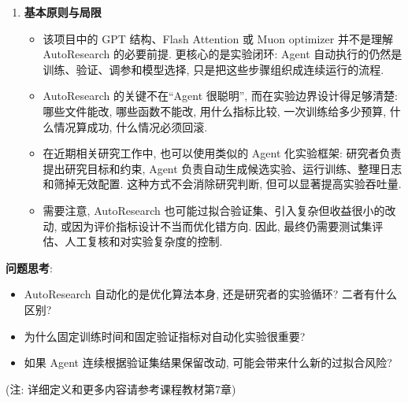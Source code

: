 \documentclass{../nndlcourse}
\begin{document}
\begin{enumerate}
\begin{itemize}
\begin{itemize}
          \item \texttt{train.py}: Agent 唯一允许修改的核心文件. 它包含模型、optimizer、batch size、学习率、训练循环和最终打印的实验摘要.
          \item \texttt{program.md}: 人类写给 Agent 的实验规则. 它规定先跑 baseline, 再循环执行“修改 \texttt{train.py}、提交、训练、读取指标、记录结果、保留或回滚”.
        \end{itemize}
      \item 固定 5 分钟训练预算是一个关键设计. 如果某次改动让模型更大, 它可能单步更强但训练步数更少; 如果某次改动让模型更小, 它可能单步更弱但跑得更快. 固定真实耗时后, 比较的是“在同一算力和时间约束下谁能在没见过的数据上预测得更好”.
      \item \texttt{program.md} 还要求把每次实验写入 \texttt{results.tsv}, 包括这次代码版本记录 (commit)、验证集预测损失、显存、状态和实验描述. 若指标改善, 就保留这次代码版本; 若指标变差或程序崩溃, 就回到上一版. 这相当于把研究过程做成一个可复现的闭环:
      \[
        \text{提出想法}
        \rightarrow
        \text{改代码}
        \rightarrow
        \text{固定预算训练}
        \rightarrow
        \text{验证集评价}
        \rightarrow
        \text{记录并保留/回滚}.
      \]
    \end{itemize}
  \item \textbf{基本原则与局限}
    \begin{itemize}
      \item 该项目中的 GPT 结构、Flash Attention 或 Muon optimizer 并不是理解 AutoResearch 的必要前提. 更核心的是实验闭环: Agent 自动执行的仍然是训练、验证、调参和模型选择, 只是把这些步骤组织成连续运行的流程.
      \item AutoResearch 的关键不在“Agent 很聪明”, 而在实验边界设计得足够清楚: 哪些文件能改, 哪些函数不能改, 用什么指标比较, 一次训练给多少预算, 什么情况算成功, 什么情况必须回滚.
      \item 在近期相关研究工作中, 也可以使用类似的 Agent 化实验框架: 研究者负责提出研究目标和约束, Agent 负责自动生成候选实验、运行训练、整理日志和筛掉无效配置. 这种方式不会消除研究判断, 但可以显著提高实验吞吐量.
      \item 需要注意, AutoResearch 也可能过拟合验证集、引入复杂但收益很小的改动, 或因为评价指标设计不当而优化错方向. 因此, 最终仍需要测试集评估、人工复核和对实验复杂度的控制.
    \end{itemize}
\end{enumerate}

\textbf{问题思考}:
\begin{itemize}
  \item AutoResearch 自动化的是优化算法本身, 还是研究者的实验循环? 二者有什么区别?
  \item 为什么固定训练时间和固定验证指标对自动化实验很重要?
  \item 如果 Agent 连续根据验证集结果保留改动, 可能会带来什么新的过拟合风险?
\end{itemize}


(注: 详细定义和更多内容请参考课程教材第7章)
\end{document}
